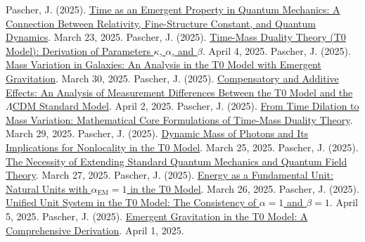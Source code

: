 \documentclass[a4paper,12pt]{article}
\newcommand{\alphaEM}{\alpha_{\text{EM}}}
\begin{document}
	\begin{thebibliography}{99}
		 Pascher, J. (2025). \href{https://github.com/jpascher/T0-Time-Mass-Duality/tree/main/2/pdf/English/ZeitEmergentQMEn.pdf}{Time as an Emergent Property in Quantum Mechanics: A Connection Between Relativity, Fine-Structure Constant, and Quantum Dynamics}. March 23, 2025.
		 Pascher, J. (2025). \href{https://github.com/jpascher/T0-Time-Mass-Duality/tree/main/2/pdf/English/ZeitMasseT0ParamsEn.pdf}{Time-Mass Duality Theory (T0 Model): Derivation of Parameters \(\kappa\), \(\alpha\), and \(\beta\)}. April 4, 2025.
		 Pascher, J. (2025). \href{https://github.com/jpascher/T0-Time-Mass-Duality/tree/main/2/pdf/English/MassVarGalaxienEn.pdf}{Mass Variation in Galaxies: An Analysis in the T0 Model with Emergent Gravitation}. March 30, 2025.
		 Pascher, J. (2025). \href{https://github.com/jpascher/T0-Time-Mass-Duality/tree/main/2/pdf/English/MessdifferenzenT0StandardEn.pdf}{Compensatory and Additive Effects: An Analysis of Measurement Differences Between the T0 Model and the \(\Lambda\)CDM Standard Model}. April 2, 2025.
		 Pascher, J. (2025). \href{https://github.com/jpascher/T0-Time-Mass-Duality/tree/main/2/pdf/English/MathZeitMasseLagrangeEn.pdf}{From Time Dilation to Mass Variation: Mathematical Core Formulations of Time-Mass Duality Theory}. March 29, 2025.
		 Pascher, J. (2025). \href{https://github.com/jpascher/T0-Time-Mass-Duality/tree/main/2/pdf/English/DynMassePhotonenNichtlokalEn.pdf}{Dynamic Mass of Photons and Its Implications for Nonlocality in the T0 Model}. March 25, 2025.
		 Pascher, J. (2025). \href{https://github.com/jpascher/T0-Time-Mass-Duality/tree/main/2/pdf/English/NotwendigkeitQMErweiterungEn.pdf}{The Necessity of Extending Standard Quantum Mechanics and Quantum Field Theory}. March 27, 2025.
		 Pascher, J. (2025). \href{https://github.com/jpascher/T0-Time-Mass-Duality/tree/main/2/pdf/English/NatEinheitenAlpha1En.pdf}{Energy as a Fundamental Unit: Natural Units with \(\alphaEM = 1\) in the T0 Model}. March 26, 2025.
		 Pascher, J. (2025). \href{https://github.com/jpascher/T0-Time-Mass-Duality/tree/main/2/pdf/English/Alpha1Beta1KonsistenzEn.pdf}{Unified Unit System in the T0 Model: The Consistency of \(\alpha = 1\) and \(\beta = 1\)}. April 5, 2025.
		 Pascher, J. (2025). \href{https://github.com/jpascher/T0-Time-Mass-Duality/tree/main/2/pdf/English/EmergentGravT0En.pdf}{Emergent Gravitation in the T0 Model: A Comprehensive Derivation}. April 1, 2025.

\end{thebibliography}
\end{document}
